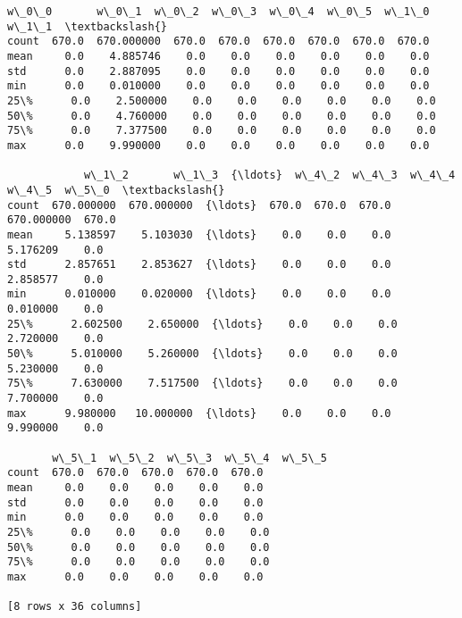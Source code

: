 \documentclass[11pt]{article}
\makeatletter
\newcommand{\boxspacing}{\kern\kvtcb@left@rule\kern\kvtcb@boxsep}
\newcommand{\prompt}[4]{
        \ttfamily\llap{{\color{#2}[#3]:\hspace{3pt}#4}}\vspace{-\baselineskip}
    }
\makeatother
\begin{document}
            \begin{tcolorbox}[breakable, size=fbox, boxrule=.5pt, pad at break*=1mm, opacityfill=0]
\prompt{Out}{outcolor}{31}{\boxspacing}
\begin{Verbatim}[commandchars=\\\{\}]
       w\_0\_0       w\_0\_1  w\_0\_2  w\_0\_3  w\_0\_4  w\_0\_5  w\_1\_0  w\_1\_1  \textbackslash{}
count  670.0  670.000000  670.0  670.0  670.0  670.0  670.0  670.0
mean     0.0    4.885746    0.0    0.0    0.0    0.0    0.0    0.0
std      0.0    2.887095    0.0    0.0    0.0    0.0    0.0    0.0
min      0.0    0.010000    0.0    0.0    0.0    0.0    0.0    0.0
25\%      0.0    2.500000    0.0    0.0    0.0    0.0    0.0    0.0
50\%      0.0    4.760000    0.0    0.0    0.0    0.0    0.0    0.0
75\%      0.0    7.377500    0.0    0.0    0.0    0.0    0.0    0.0
max      0.0    9.990000    0.0    0.0    0.0    0.0    0.0    0.0

            w\_1\_2       w\_1\_3  {\ldots}  w\_4\_2  w\_4\_3  w\_4\_4       w\_4\_5  w\_5\_0  \textbackslash{}
count  670.000000  670.000000  {\ldots}  670.0  670.0  670.0  670.000000  670.0
mean     5.138597    5.103030  {\ldots}    0.0    0.0    0.0    5.176209    0.0
std      2.857651    2.853627  {\ldots}    0.0    0.0    0.0    2.858577    0.0
min      0.010000    0.020000  {\ldots}    0.0    0.0    0.0    0.010000    0.0
25\%      2.602500    2.650000  {\ldots}    0.0    0.0    0.0    2.720000    0.0
50\%      5.010000    5.260000  {\ldots}    0.0    0.0    0.0    5.230000    0.0
75\%      7.630000    7.517500  {\ldots}    0.0    0.0    0.0    7.700000    0.0
max      9.980000   10.000000  {\ldots}    0.0    0.0    0.0    9.990000    0.0

       w\_5\_1  w\_5\_2  w\_5\_3  w\_5\_4  w\_5\_5
count  670.0  670.0  670.0  670.0  670.0
mean     0.0    0.0    0.0    0.0    0.0
std      0.0    0.0    0.0    0.0    0.0
min      0.0    0.0    0.0    0.0    0.0
25\%      0.0    0.0    0.0    0.0    0.0
50\%      0.0    0.0    0.0    0.0    0.0
75\%      0.0    0.0    0.0    0.0    0.0
max      0.0    0.0    0.0    0.0    0.0

[8 rows x 36 columns]
\end{Verbatim}
\end{tcolorbox}
        
    
\end{document}
